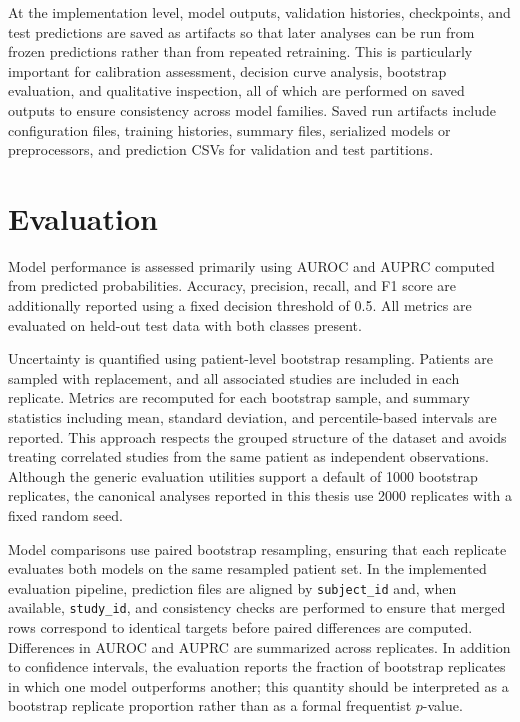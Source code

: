 At the implementation level, model outputs, validation histories, checkpoints, and test predictions are saved as artifacts so that later analyses can be run from frozen predictions rather than from repeated retraining. This is particularly important for calibration assessment, decision curve analysis, bootstrap evaluation, and qualitative inspection, all of which are performed on saved outputs to ensure consistency across model families. Saved run artifacts include configuration files, training histories, summary files, serialized models or preprocessors, and prediction CSVs for validation and test partitions.

\section{Evaluation}

Model performance is assessed primarily using AUROC and AUPRC computed from predicted probabilities. Accuracy, precision, recall, and F1 score are additionally reported using a fixed decision threshold of 0.5. All metrics are evaluated on held-out test data with both classes present.

Uncertainty is quantified using patient-level bootstrap resampling. Patients are sampled with replacement, and all associated studies are included in each replicate. Metrics are recomputed for each bootstrap sample, and summary statistics including mean, standard deviation, and percentile-based intervals are reported. This approach respects the grouped structure of the dataset and avoids treating correlated studies from the same patient as independent observations. Although the generic evaluation utilities support a default of 1000 bootstrap replicates, the canonical analyses reported in this thesis use 2000 replicates with a fixed random seed.

Model comparisons use paired bootstrap resampling, ensuring that each replicate evaluates both models on the same resampled patient set. In the implemented evaluation pipeline, prediction files are aligned by \texttt{subject\_id} and, when available, \texttt{study\_id}, and consistency checks are performed to ensure that merged rows correspond to identical targets before paired differences are computed. Differences in AUROC and AUPRC are summarized across replicates. In addition to confidence intervals, the evaluation reports the fraction of bootstrap replicates in which one model outperforms another; this quantity should be interpreted as a bootstrap replicate proportion rather than as a formal frequentist \(p\)-value.

